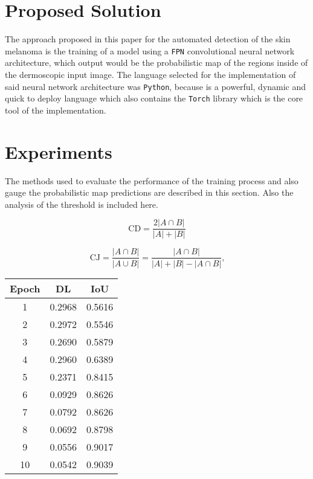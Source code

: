 \section{Proposed Solution}
The approach proposed in this paper for the automated detection of the skin melanoma is the training of a model using a \texttt{FPN} convolutional neural network architecture, which output would be the probabilistic map of the regions inside of the dermoscopic input image. The language selected for the implementation of said neural network architecture was \texttt{Python}, because is a powerful, dynamic and quick to deploy language which also contains the \texttt{Torch} library which is the core tool of the implementation.

\section{Experiments}
The methods used to evaluate the performance of the training process and also gauge the probabilistic map predictions are described in this section. Also the analysis of the threshold is included here.

\begin{center}
  \begin{equation}\label{eq:dice_loss}
      \text{CD} = \frac{2|A \cap B |}{|A| + |B|}
  \end{equation}        
\end{center}

\begin{equation}\label{eq:jacc}
  \text{CJ} = \frac{|A \cap B|}{| A \cup B |} = \frac{|A \cap B|}{|A| + |B| - |A \cap B|} \text{,}
\end{equation}

\begin{table}[h]
  \centering
  \begin{tabular}{c c c}
    \toprule
    \textbf{Epoch} & \textbf{DL} & \textbf{IoU} \\
    \midrule
    1 & 0.2968 & 0.5616 \\
    2 & 0.2972 & 0.5546 \\
    3 & 0.2690 & 0.5879 \\
    4 & 0.2960 & 0.6389 \\
    5 & 0.2371 & 0.8415 \\
    6 & 0.0929 & 0.8626 \\
    7 & 0.0792 & 0.8626 \\
    8 & 0.0692 & 0.8798 \\
    9 & 0.0556 & 0.9017 \\
    10 & 0.0542 & 0.9039 \\
    \bottomrule
    
  \end{tabular}
\end{table}
